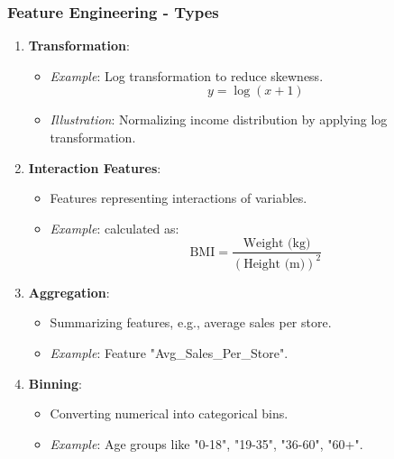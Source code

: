 \documentclass{beamer}
\begin{document}
\begin{frame}[fragile]
    \frametitle{Feature Engineering - Types}
    \begin{enumerate}
        \item \textbf{Transformation}:
        \begin{itemize}
            \item \textit{Example}: Log transformation to reduce skewness.
            \begin{equation}
                y = \log(x + 1)
            \end{equation}
            \item \textit{Illustration}: Normalizing income distribution by applying log transformation.
        \end{itemize}

        \item \textbf{Interaction Features}:
        \begin{itemize}
            \item Features representing interactions of variables.
            \item \textit{Example}:  calculated as:
            \begin{equation}
                \text{BMI} = \frac{\text{Weight (kg)}}{(\text{Height (m)})^2}
            \end{equation}
        \end{itemize}

        \item \textbf{Aggregation}:
        \begin{itemize}
            \item Summarizing features, e.g., average sales per store.
            \item \textit{Example}: Feature "Avg\_Sales\_Per\_Store".
        \end{itemize}
        
        \item \textbf{Binning}:
        \begin{itemize}
            \item Converting numerical into categorical bins.
            \item \textit{Example}: Age groups like "0-18", "19-35", "36-60", "60+".
        \end{itemize}
    \end{enumerate}
\end{frame}
\end{document}
